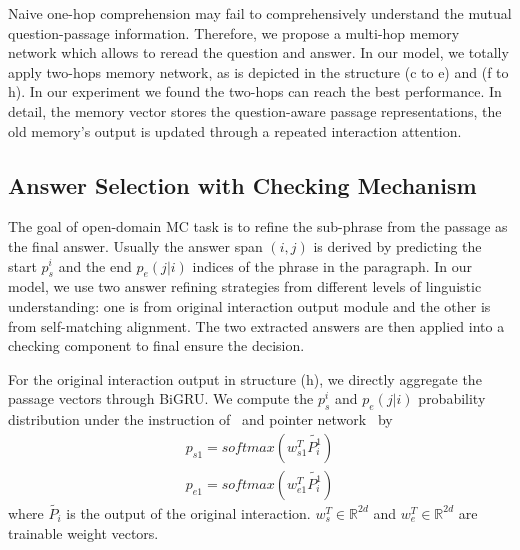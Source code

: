 \documentclass[letterpaper]{article} \usepackage{aaai18}  \usepackage{times}  \usepackage{helvet}  \usepackage{courier}  \usepackage{url}  \usepackage{graphicx}  \usepackage{booktabs}
\begin{document}
Naive one-hop comprehension may fail to comprehensively understand the mutual question-passage information. Therefore, we propose a multi-hop memory network which allows to reread the question and answer. In our model, we totally apply two-hops memory network, as is depicted in the structure (c to e) and (f to h). In our experiment we found the two-hops can reach the best performance. In detail, the memory vector stores the question-aware passage representations, the old memory's output is updated through a repeated interaction attention. 
\subsection{Answer Selection with Checking Mechanism}
The goal of open-domain MC task is to refine the sub-phrase from the passage as the final answer. Usually the answer span $(i, j)$ is derived by predicting the start $p_s^i$ and the end $p_e(j|i)$ indices of the phrase in the paragraph. In our model, we use two answer refining strategies from different levels of linguistic understanding: one is from original interaction output module and the other is from self-matching alignment. The two extracted answers are then applied into a checking component to final ensure the decision.

For the original interaction output in structure (h), we directly aggregate the passage vectors through BiGRU. We compute the $p_s^i$ and $p_e(j|i)$ probability distribution under the instruction of~\cite{Wang2016Machine} and pointer network~\cite{Vinyals2015PointerN} by  
\begin{align*}
p_{s1}=softmax(w^T_{s1}\widetilde{P_i^1})\\
p_{e1}=softmax(w^T_{e1}\widetilde{P_i^1}) \tag{8}
\end{align*}
where $\widetilde{P_i}$ is the output of the original interaction. $w^T_s \in \mathbb{R}^{2d}$ and $w^T_e \in \mathbb{R}^{2d}$ are trainable weight vectors.  
\end{document}

